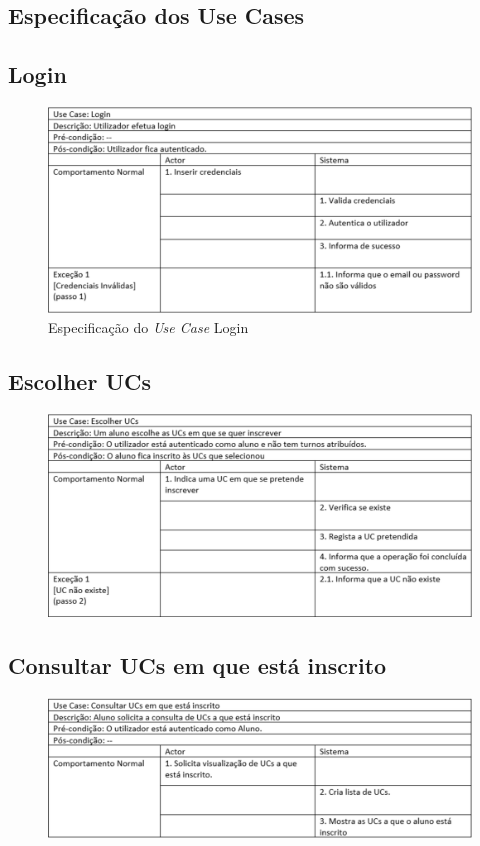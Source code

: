 \documentclass[12pt,a4paper]{report}
\begin{document}
\begin{appendices}
\chapter{Especificação dos Use Cases}
\section{Login}
\begin{figure}[H]
	\centering 
	\includegraphics[width=\textwidth]{modelacao/especificacao_use_case/Login.png}  
	\caption{Especificação do \emph{Use Case} Login}
\end{figure}
\section{Escolher UCs}
\begin{figure}[H]
	\centering 
	\includegraphics[width=\textwidth]{modelacao/especificacao_use_case/EscolherUCs.png}  
\end{figure}

\section{Consultar UCs em que está inscrito}
\begin{figure}[H]
	\centering 
	\includegraphics[width=\textwidth]{modelacao/especificacao_use_case/ConsultarUCsInscrito.png}  
\end{figure}


\end{appendices}
\end{document}
